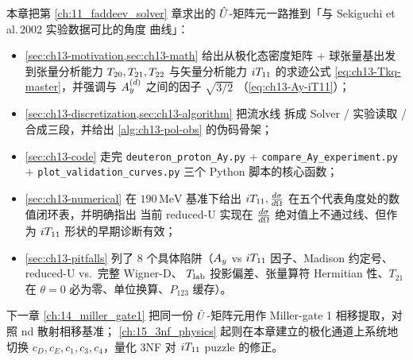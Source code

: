 本章把第 \ref{ch:11_faddeev_solver} 章求出的
\(\hat{U}\)-矩阵元一路推到「与 Sekiguchi et al.\,2002 实验数据可比的角度
曲线」：

\begin{itemize}
  \item \cref{sec:ch13-motivation,sec:ch13-math} 给出从极化态密度矩阵 +
        球张量基出发到张量分析能力 \({T_{20}}, {T_{21}},
        {T_{22}}\) 与矢量分析能力 \({i T_{11}}\) 的求迹公式
        \eqref{eq:ch13-Tkq-master}，并强调与 \(A_y^{(d)}\) 之间的因子
        \(\sqrt{3/2}\) （\cref{eq:ch13-Ay-iT11}）；
  \item \cref{sec:ch13-discretization,sec:ch13-algorithm} 把流水线
        拆成 Solver / 实验读取 / 合成三段，并给出
        \cref{alg:ch13-pol-obs} 的伪码骨架；
  \item \cref{sec:ch13-code} 走完
        \texttt{deuteron\_proton\_Ay.py} +
        \texttt{compare\_Ay\_experiment.py} +
        \texttt{plot\_validation\_curves.py} 三个 Python 脚本的核心函数；
  \item \cref{sec:ch13-numerical} 在 \(190\,\text{MeV}\) 基准下给出
        \({i T_{11}}, \frac{d\sigma}{d\Omega}\) 在五个代表角度处的数值闭环表，并明确指出
        当前 reduced-U 实现在 \(\frac{d\sigma}{d\Omega}\) 绝对值上不通过线、但作为
        \({i T_{11}}\) 形状的早期诊断有效；
  \item \cref{sec:ch13-pitfalls} 列了 8 个具体陷阱（\(A_y\) vs
        \({i T_{11}}\) 因子、Madison 约定号、reduced-U vs.\ 完整 Wigner-D、
        \({T_{\text{lab}}}\) 投影偏差、张量算符 Hermitian 性、\(T_{21}\) 在
        \(\theta=0\) 必为零、单位换算、\(P_{123}\) 缓存）。
\end{itemize}

下一章 \ref{ch:14_miller_gate1} 把同一份 \(\hat{U}\)-矩阵元用作
Miller-gate 1 相移提取，对照 nd 散射相移基准；
\cref{ch:15_3nf_physics} 起则在本章建立的极化通道上系统地切换
\(c_D, c_E, c_1, c_3, c_4\)，量化 3NF 对 \({i T_{11}}\) puzzle 的修正。
